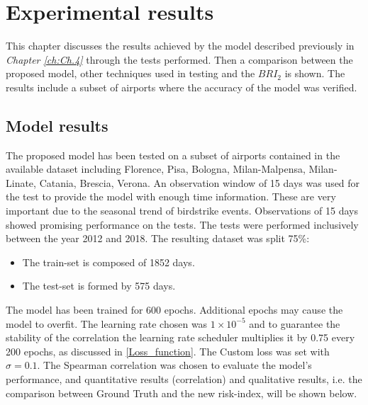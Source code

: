 \chapter{Experimental results}\label{ch:Ch.5}
This chapter discusses the results achieved by the model described previously in \textit{Chapter \ref{ch:Ch.4}} through the tests performed.
Then a comparison between the proposed model, other techniques used in testing and the $BRI_2$ is shown.
The results include a subset of airports where the accuracy of the model was verified.

\section{Model results}\label{results}
The proposed model has been tested on a subset of airports contained in the available dataset including Florence, Pisa, Bologna, Milan-Malpensa, Milan-Linate, Catania, Brescia, Verona.
An observation window of 15 days was used for the test to provide the model with enough time information. These are very important due to the seasonal trend of birdstrike events. Observations of 15 days showed promising performance on the tests.
The tests were performed inclusively between the year 2012 and 2018. The resulting dataset was split 75\%:
\begin{itemize}
    \item The train-set is composed of 1852 days.
    \item The test-set is formed by 575 days.
\end{itemize}
The model has been trained for 600 epochs. Additional epochs may cause the model to overfit.
The learning rate chosen was $1\times10^{-5}$ and to guarantee the stability of the correlation the learning rate scheduler multiplies it by 0.75 every 200 epochs, as discussed in \ref{Loss_function}.
The Custom loss was set with $\sigma = 0.1$.
The Spearman correlation was chosen to evaluate the model's performance, and quantitative results (correlation) and qualitative results, i.e. the comparison between Ground Truth and the new risk-index, will be shown below.


